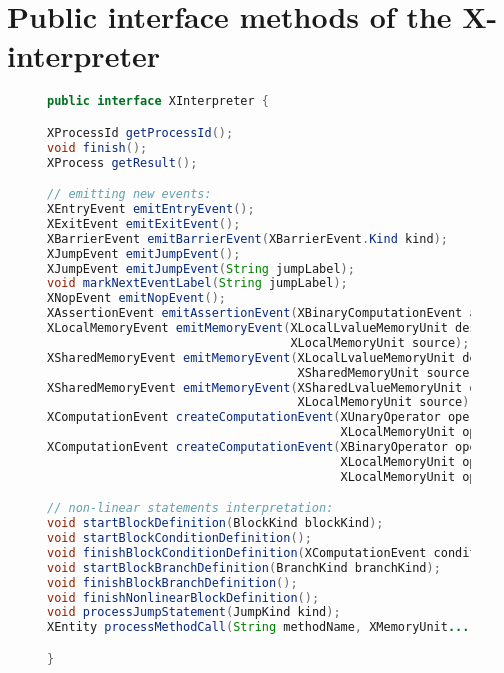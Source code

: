 \section{Public interface methods of the X-interpreter}
\label{apx:xinterpreter}

\begin{figure}[H]
%
%
\begin{lstlisting}[language=Java]
public interface XInterpreter {

XProcessId getProcessId();
void finish();
XProcess getResult();

// emitting new events:
XEntryEvent emitEntryEvent();
XExitEvent emitExitEvent();
XBarrierEvent emitBarrierEvent(XBarrierEvent.Kind kind);
XJumpEvent emitJumpEvent();
XJumpEvent emitJumpEvent(String jumpLabel);
void markNextEventLabel(String jumpLabel);
XNopEvent emitNopEvent();
XAssertionEvent emitAssertionEvent(XBinaryComputationEvent assertion);
XLocalMemoryEvent emitMemoryEvent(XLocalLvalueMemoryUnit destination,
                                  XLocalMemoryUnit source);
XSharedMemoryEvent emitMemoryEvent(XLocalLvalueMemoryUnit destination,
                                   XSharedMemoryUnit source);
XSharedMemoryEvent emitMemoryEvent(XSharedLvalueMemoryUnit destination,
                                   XLocalMemoryUnit source);
XComputationEvent createComputationEvent(XUnaryOperator operator,
                                         XLocalMemoryUnit operand);
XComputationEvent createComputationEvent(XBinaryOperator operator,
                                         XLocalMemoryUnit operand1, 
                                         XLocalMemoryUnit operand2);

// non-linear statements interpretation:
void startBlockDefinition(BlockKind blockKind);
void startBlockConditionDefinition();
void finishBlockConditionDefinition(XComputationEvent condition);
void startBlockBranchDefinition(BranchKind branchKind);
void finishBlockBranchDefinition();
void finishNonlinearBlockDefinition();
void processJumpStatement(JumpKind kind);
XEntity processMethodCall(String methodName, XMemoryUnit... arguments);

}
\end{lstlisting}
\end{figure}
\nopagebreak[4]